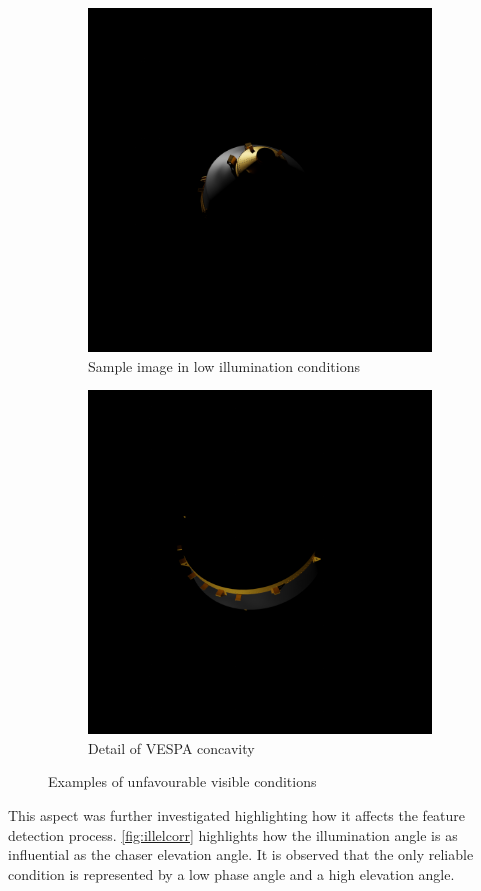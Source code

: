 \begin{figure}[!h]
    \begin{subfigure}{0.48\linewidth}
    \centering
    \includegraphics[width = 0.75\linewidth]{Images/frame_00215.png}
    \caption{Sample image in low illumination conditions}
    \label{fig:frame215}
    \end{subfigure}\hfill
    \begin{subfigure}{0.48\linewidth}
    \centering
    \includegraphics[width = 0.75\linewidth]{Images/frame_00022.png}
    \caption{Detail of VESPA concavity}
    \label{fig:frame022}
    \end{subfigure}
    \caption{Examples of unfavourable visible conditions}
    \label{fig:lowillimages}
\end{figure}
This aspect was further investigated highlighting how it affects the feature detection process. \cref{fig:illelcorr} highlights how the illumination angle is as influential as the chaser elevation angle. It is observed that the only reliable condition is represented by a low phase angle and a high elevation angle. \\

